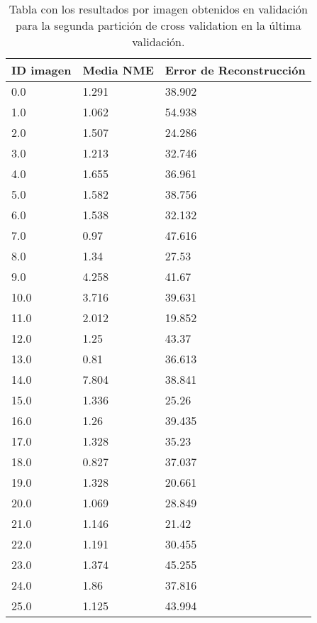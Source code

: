 \begin{table}[!ht]
    \centering
    \caption{Tabla con los resultados por imagen obtenidos en validación para la segunda partición de cross validation en la última validación.}
    \begin{tabular}{|l|l|l|}
    \hline
        ID imagen & Media NME & Error de Reconstrucción \\ \hline
        0.0 & 1.291 & 38.902 \\ \hline
        1.0 & 1.062 & 54.938 \\ \hline
        2.0 & 1.507 & 24.286 \\ \hline
        3.0 & 1.213 & 32.746 \\ \hline
        4.0 & 1.655 & 36.961 \\ \hline
        5.0 & 1.582 & 38.756 \\ \hline
        6.0 & 1.538 & 32.132 \\ \hline
        7.0 & 0.97 & 47.616 \\ \hline
        8.0 & 1.34 & 27.53 \\ \hline
        9.0 & 4.258 & 41.67 \\ \hline
        10.0 & 3.716 & 39.631 \\ \hline
        11.0 & 2.012 & 19.852 \\ \hline
        12.0 & 1.25 & 43.37 \\ \hline
        13.0 & 0.81 & 36.613 \\ \hline
        14.0 & 7.804 & 38.841 \\ \hline
        15.0 & 1.336 & 25.26 \\ \hline
        16.0 & 1.26 & 39.435 \\ \hline
        17.0 & 1.328 & 35.23 \\ \hline
        18.0 & 0.827 & 37.037 \\ \hline
        19.0 & 1.328 & 20.661 \\ \hline
        20.0 & 1.069 & 28.849 \\ \hline
        21.0 & 1.146 & 21.42 \\ \hline
        22.0 & 1.191 & 30.455 \\ \hline
        23.0 & 1.374 & 45.255 \\ \hline
        24.0 & 1.86 & 37.816 \\ \hline
        25.0 & 1.125 & 43.994 \\ \hline
    \end{tabular}
    \label{table:Daugmentation_images_2}
\end{table}

